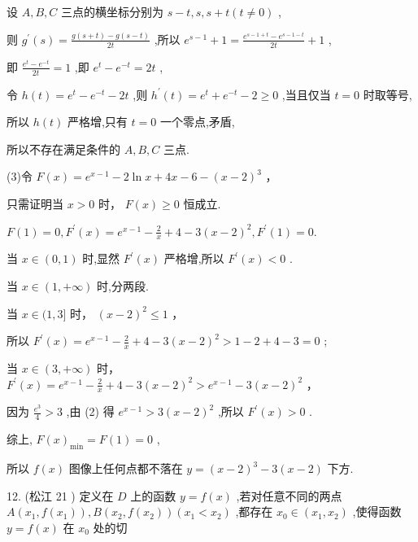 \documentclass[10pt]{article}
\newcommand*\circled[1]{\tikz[baseline=(char.base)]{\node[shape=circle,draw,inner sep=1.5pt] (char) {\small #1};}}
\begin{document}
设 \(A,B,C\) 三点的横坐标分别为 \(s - t,s,s + t\left( {t \neq  0}\right)\) ,

则 \({g}^{\prime }\left( s\right)  = \frac{g\left( {s + t}\right)  - g\left( {s - t}\right) }{2t}\) ,所以 \({e}^{s - 1} + 1 = \frac{{e}^{s - 1 + t} - {e}^{s - 1 - t}}{2t} + 1\) ,

即 \(\frac{{e}^{t} - {e}^{-t}}{2t} = 1\) ,即 \({e}^{t} - {e}^{-t} = {2t}\) ,

令 \(h\left( t\right)  = {e}^{t} - {e}^{-t} - {2t}\) ,则 \({h}^{\prime }\left( t\right)  = {e}^{t} + {e}^{-t} - 2 \geq  0\) ,当且仅当 \(t = 0\) 时取等号,

所以 \(h\left( t\right)\) 严格增,只有 \(t = 0\) 一个零点,矛盾,

所以不存在满足条件的 \(A,B,C\) 三点.

(3)令 \(F\left( x\right)  = {e}^{x - 1} - 2\ln x + {4x} - 6 - {\left( x - 2\right) }^{3}\) ，

只需证明当 \(x > 0\) 时， \(F\left( x\right)  \geq  0\) 恒成立.

\(F\left( 1\right)  = 0,{F}^{\prime }\left( x\right)  = {e}^{x - 1} - \frac{2}{x} + 4 - 3{\left( x - 2\right) }^{2},{F}^{\prime }\left( 1\right)  = 0.\)

当 \(x \in  \left( {0,1}\right)\) 时,显然 \({F}^{\prime }\left( x\right)\) 严格增,所以 \({F}^{\prime }\left( x\right)  < 0\) .

当 \(x \in  \left( {1, + \infty }\right)\) 时,分两段.

 \circled{1}  当 \(x \in  (1,3\rbrack\) 时， \({\left( x - 2\right) }^{2} \leq  1\) ，

所以 \({F}^{\prime }\left( x\right)  = {e}^{x - 1} - \frac{2}{x} + 4 - 3{\left( x - 2\right) }^{2} > 1 - 2 + 4 - 3 = 0\) ;

 \circled{2}  当 \(x \in  \left( {3, + \infty }\right)\) 时， \({F}^{\prime }\left( x\right)  = {e}^{x - 1} - \frac{2}{x} + 4 - 3{\left( x - 2\right) }^{2} > {e}^{x - 1} - 3{\left( x - 2\right) }^{2}\) ，

因为 \(\frac{{e}^{3}}{4} > 3\) ,由 (2) 得 \({e}^{x - 1} > 3{\left( x - 2\right) }^{2}\) ,所以 \({F}^{\prime }\left( x\right)  > 0\) .

综上, \(F{\left( x\right) }_{\min } = F\left( 1\right)  = 0\) ,

所以 \(f\left( x\right)\) 图像上任何点都不落在 \(y = {\left( x - 2\right) }^{3} - 3\left( {x - 2}\right)\) 下方.

12. (松江 21 ) 定义在 \(D\) 上的函数 \(y = f\left( x\right)\) ,若对任意不同的两点 \(A\left( {{x}_{1},f\left( {x}_{1}\right) }\right) ,B\left( {{x}_{2},f\left( {x}_{2}\right) }\right) \left( {{x}_{1} < {x}_{2}}\right)\) ,都存在 \({x}_{0} \in  \left( {{x}_{1},{x}_{2}}\right)\) ,使得函数 \(y = f\left( x\right)\) 在 \({x}_{0}\) 处的切
\end{document}
